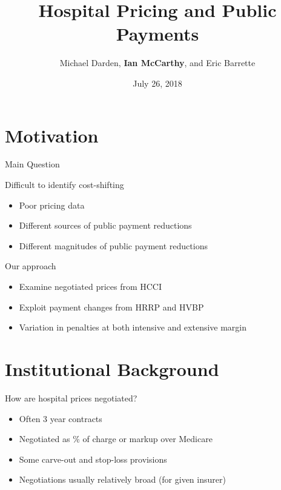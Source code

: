 \documentclass[t]{beamer}
\title{Hospital Pricing and Public Payments}
\date{July 26, 2018}
\author{Michael Darden, \textbf{Ian McCarthy}, and Eric Barrette}
\institute{2018 NBER Summer Institute, Health Care}
\begin{document}
\maketitle

\section{Motivation}
\begin{frame}{Main Question}
\end{frame}

\begin{frame}{Difficult to identify cost-shifting}
    \begin{itemize}
        \item Poor pricing data
        \item Different sources of public payment reductions
        \item Different magnitudes of public payment reductions
    \end{itemize}
\end{frame}

\begin{frame}{Our approach}
    \begin{itemize}
        \item Examine negotiated prices from HCCI
        \item Exploit payment changes from HRRP and HVBP
        \item Variation in penalties at both intensive and extensive margin
    \end{itemize}
\end{frame}


\section{Institutional Background}
\begin{frame}{How are hospital prices negotiated?}
    \begin{itemize}
        \item Often 3 year contracts
        \item Negotiated as \% of charge or markup over Medicare
        \item Some carve-out and stop-loss provisions
        \item Negotiations usually relatively broad (for given insurer)
    \end{itemize}
\end{frame}
\end{document}
